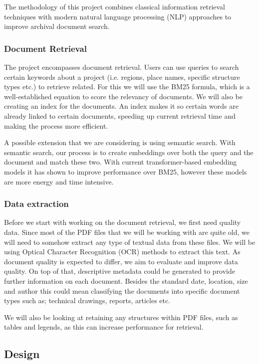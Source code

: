 The methodology of this project combines classical information retrieval techniques with modern natural language processing (NLP) approaches to improve archival document search.

\subsubsection{Document Retrieval}
The project encompasses document retrieval. Users can use queries to search certain keywords about a project (i.e. regions, place names, specific structure types etc.)
to retrieve related. For this we will use the BM25 formula, which is a well-established equation to score the relevancy of documents.
We will also be creating an index for the documents. An index makes it so certain words are already linked to certain documents, speeding up current retrieval time and making the process more efficient.

A possible extension that we are considering is using semantic search. With semantic search, our process is to create embeddings over both the query and the document and match these two.
With current transformer-based embedding models it has shown to improve performance over BM25, however these models are more energy and time intensive.

\subsubsection{Data extraction}
Before we start with working on the document retrieval, we first need quality data. 
Since most of the PDF files that we will be working with are quite old, we will need to somehow extract any type of textual data from these files. 
We will be using Optical Character Recognition (OCR) methods to extract this text. 
As document quality is expected to differ, we aim to evaluate and improve data quality.
On top of that, descriptive metadata could be generated to provide further information on each document. 
Besides the standard date, location, size and author this could mean classifying the documents into specific document types such as; technical drawings, reports, articles etc.

We will also be looking at retaining any structures within PDF files, such as tables and legends, as this can increase performance for retrieval.


\subsection{Design}


